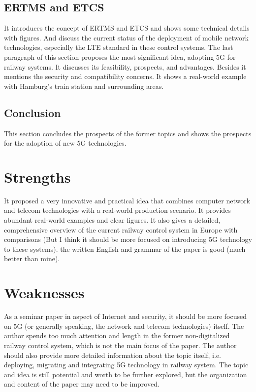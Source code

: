 \documentclass[a4paper,9pt]{scrartcl}
\begin{document}
\subsection{ERTMS and ETCS}
It introduces the concept of ERTMS and ETCS and shows some technical details with figures. And discuss the current status of the deployment of mobile network technologies, especially the LTE standard in these control systems.
The last paragraph of this section proposes the most significant idea, adopting 5G for railway systems. It discusses its feasibility, prospects, and advantages. Besides it mentions the security and compatibility concerns. It shows a real-world example with Hamburg's train station and surrounding areas.

\subsection{Conclusion}
This section concludes the prospects of the former topics and shows the prospects for the adoption of new 5G technologies.

\section{Strengths}
It proposed a very innovative and practical idea that combines computer network and telecom technologies with a real-world production scenario. It provides abundant real-world examples and clear figures.
It also gives a detailed, comprehensive overview of the current railway control system in Europe with comparisons (But I think it should be more focused on introducing 5G technology to these systems).
the written English and grammar of the paper is good (much better than mine).

\section{Weaknesses}
As a seminar paper in aspect of Internet and security, it should be more focused on 5G (or generally speaking, the network and telecom technologies) itself. The author spends too much attention and length in the former non-digitalized railway control system, which is not the main focus of the paper.
The author should also provide more detailed information about the topic itself, i.e. deploying, migrating and integrating 5G technology in railway system.
The topic and idea is still potential and worth to be further explored, but the organization and content of the paper may need to be improved.
\end{document}
